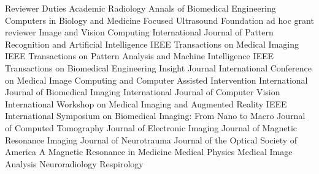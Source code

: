 \documentclass{resume}
\begin{document}
\begin{category}{Reviewer Duties}
\citemnobullet Academic Radiology
\citemnobullet Annals of Biomedical Engineering
\citemnobullet Computers in Biology and Medicine
\citemnobullet Focused Ultrasound Foundation ad hoc grant reviewer
\citemnobullet Image and Vision Computing
\citemnobullet International Journal of Pattern Recognition and Artificial Intelligence	
\citemnobullet IEEE Transactions on Medical Imaging
\citemnobullet IEEE Transactions on Pattern Analysis and Machine Intelligence
\citemnobullet IEEE Transactions on Biomedical Engineering
\citemnobullet Insight Journal
\citemnobullet International Conference on Medical Image Computing and Computer Assisted Intervention
\citemnobullet International Journal of Biomedical Imaging
\citemnobullet International Journal of Computer Vision
\citemnobullet International Workshop on Medical Imaging and Augmented Reality
\citemnobullet IEEE International Symposium on Biomedical Imaging:  From Nano to Macro
\citemnobullet Journal of Computed Tomography
\citemnobullet Journal of Electronic Imaging
\citemnobullet Journal of Magnetic Resonance Imaging
\citemnobullet Journal of Neurotrauma
\citemnobullet Journal of the Optical Society of America A
\citemnobullet Magnetic Resonance in Medicine
\citemnobullet Medical Physics
\citemnobullet Medical Image Analysis
\citemnobullet Neuroradiology
\citemnobullet Respirology
\end{category}

\end{document}
